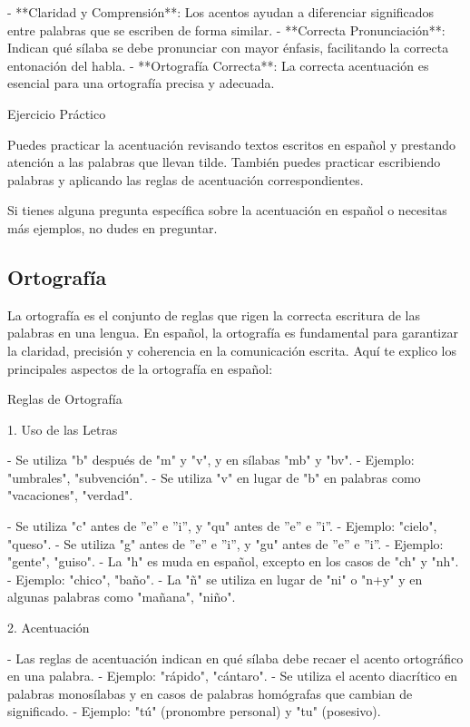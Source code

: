 - **Claridad y Comprensión**: Los acentos ayudan a diferenciar significados entre palabras que se escriben de forma similar.
- **Correcta Pronunciación**: Indican qué sílaba se debe pronunciar con mayor énfasis, facilitando la correcta entonación del habla.
- **Ortografía Correcta**: La correcta acentuación es esencial para una ortografía precisa y adecuada.

Ejercicio Práctico

Puedes practicar la acentuación revisando textos escritos en español y prestando atención a las palabras que llevan tilde. También puedes practicar escribiendo palabras y aplicando las reglas de acentuación correspondientes.

Si tienes alguna pregunta específica sobre la acentuación en español o necesitas más ejemplos, no dudes en preguntar.

\subsection{Ortografía}

La ortografía es el conjunto de reglas que rigen la correcta escritura de las palabras en una lengua. En español, la ortografía es fundamental para garantizar la claridad, precisión y coherencia en la comunicación escrita. Aquí te explico los principales aspectos de la ortografía en español:

Reglas de Ortografía

1. Uso de las Letras

- Se utiliza "b" después de "m" y "v", y en sílabas "mb" y "bv".
- Ejemplo: "umbrales", "subvención".
- Se utiliza "v" en lugar de "b" en palabras como "vacaciones", "verdad".

- Se utiliza "c" antes de ''e'' e ''i'', y "qu" antes de ''e'' e ''i''.
- Ejemplo: "cielo", "queso".
- Se utiliza "g" antes de ''e'' e ''i'', y "gu" antes de ''e'' e ''i''.
- Ejemplo: "gente", "guiso".
- La "h" es muda en español, excepto en los casos de "ch" y "nh".
- Ejemplo: "chico", "baño".
- La "ñ" se utiliza en lugar de "ni" o "n+y" y en algunas palabras como "mañana", "niño".

2. Acentuación

- Las reglas de acentuación indican en qué sílaba debe recaer el acento ortográfico en una palabra.
- Ejemplo: "rápido", "cántaro".
- Se utiliza el acento diacrítico en palabras monosílabas y en casos de palabras homógrafas que cambian de significado.
- Ejemplo: "tú" (pronombre personal) y "tu" (posesivo).

